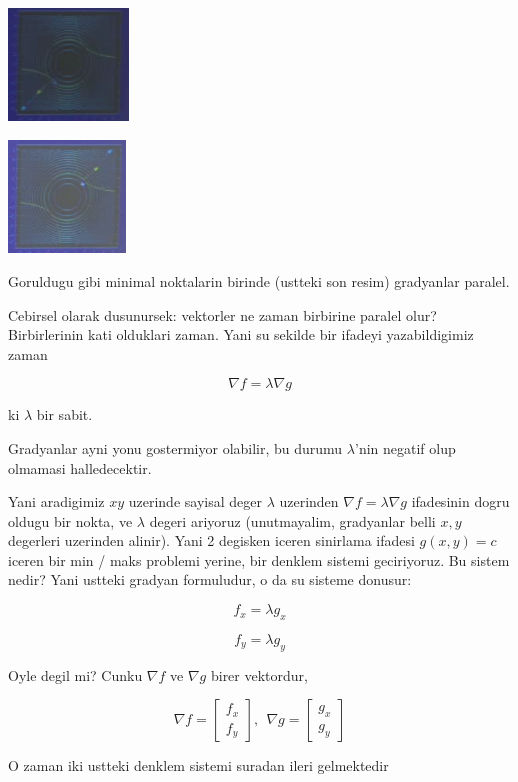 \documentclass[12pt,fleqn]{article}
\begin{document}
\includegraphics[height=3cm]{13_6.png}

\includegraphics[height=3cm]{13_5.png}

Goruldugu gibi minimal noktalarin birinde (ustteki son resim) gradyanlar
paralel. 

Cebirsel olarak dusunursek: vektorler ne zaman birbirine paralel olur?
Birbirlerinin kati olduklari zaman. Yani su sekilde bir ifadeyi
yazabildigimiz zaman

\[ \nabla f = \lambda \nabla g \]

ki $\lambda$ bir sabit. 

Gradyanlar ayni yonu gostermiyor olabilir, bu durumu $\lambda$'nin negatif
olup olmamasi halledecektir.

Yani aradigimiz $xy$ uzerinde sayisal deger $\lambda$ uzerinden $\nabla f =
\lambda \nabla g $ 
ifadesinin dogru oldugu bir nokta, ve $\lambda$ degeri
ariyoruz (unutmayalim, gradyanlar belli $x,y$ degerleri uzerinden
alinir). Yani 2 degisken iceren sinirlama ifadesi $g(x,y)=c$ iceren bir min /
maks problemi yerine, bir denklem sistemi geciriyoruz. Bu sistem nedir?
Yani ustteki gradyan formuludur, o da su sisteme donusur:

\[ f_x = \lambda g_x \]

\[ f_y = \lambda g_y \]

Oyle degil mi? Cunku $\nabla f$ ve $\nabla g$ birer vektordur, 

\[ 
\nabla f =
\left[\begin{array}{r}
f_x \\
f_y
\end{array}\right], \ \ 
\nabla g =
\left[\begin{array}{r}
g_x \\
g_y
\end{array}\right]
 \]

O zaman iki ustteki denklem sistemi suradan ileri gelmektedir
\end{document}
